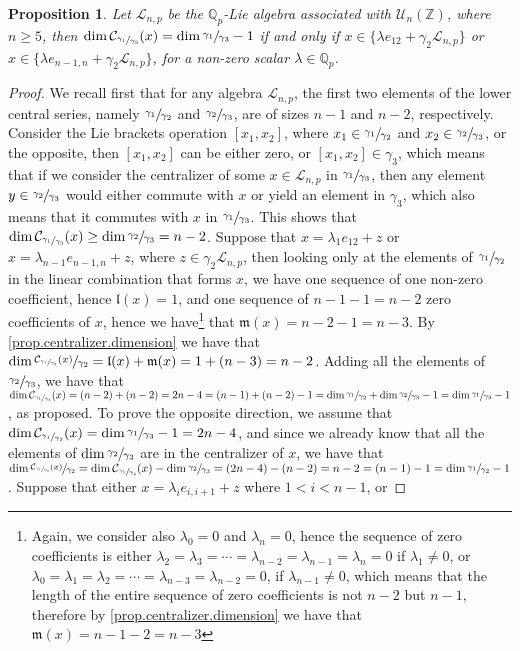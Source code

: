 \documentclass[12pt]{article}
\newtheorem{proposition}[theorem]{Proposition}
\begin{document}
\begin{proposition}
\label{prop.n.geq.5.centralizer.codimension}
Let $\mathcal{L}_{n,p}$ be the $\mathbb{Q}_p$-Lie algebra associated with $\mathcal{U}_n(\mathbb{Z})$, where $n\geq 5$, then $\dim\mathcal{C}_{\sfrac{\gamma_1}{\gamma_3}}(x)=\dim\sfrac{\gamma_1}{\gamma_3}-1$ if and only if $x\in\{\lambda e_{12}+\gamma_2\mathcal{L}_{n,p}\}$ or $x\in\{\lambda e_{n-1,n}+\gamma_2\mathcal{L}_{n,p}\}$, for a non-zero scalar $\lambda\in\mathbb{Q}_p$.
\end{proposition}
\begin{proof}
We recall first that for any algebra $\mathcal{L}_{n,p}$, the first two elements of the lower central series, namely $\sfrac{\gamma_1}{\gamma_2}$ and $\sfrac{\gamma_2}{\gamma_3}$, are of sizes $n-1$ and $n-2$, respectively. Consider the Lie brackets operation $[x_1,x_2]$, where $x_1\in\sfrac{\gamma_1}{\gamma_2}$ and $x_2\in\sfrac{\gamma_2}{\gamma_3}$, or the opposite, then $[x_1,x_2]$ can be either zero, or $[x_1,x_2]\in\gamma_3$, which means that if we consider the centralizer of some $x\in\mathcal{L}_{n,p}$ in $\sfrac{\gamma_1}{\gamma_3}$, then any element $y\in\sfrac{\gamma_2}{\gamma_3}$ would either commute with $x$ or yield an element in $\gamma_3$, which also means that it commutes with $x$ in $\sfrac{\gamma_1}{\gamma_3}$. This shows that $\dim\mathcal{C}_{\sfrac{\gamma_1}{\gamma_3}}(x)\geq\dim\sfrac{\gamma_2}{\gamma_3}=n-2$. Suppose that $x=\lambda_1 e_{12}+z$ or $x=\lambda_{n-1}e_{n-1,n}+z$, where $z\in\gamma_2\mathcal{L}_{n,p}$, then looking only at the elements of $\sfrac{\gamma_1}{\gamma_2}$ in the linear combination that forms $x$, we have one sequence of one non-zero coefficient, hence $\mathfrak{l}(x)=1$, and one sequence of $n-1-1=n-2$ zero coefficients of $x$, hence we have\footnote{Again, we consider also $\lambda_0=0$ and $\lambda_n=0$, hence the sequence of zero coefficients is either $\lambda_2=\lambda_3=\cdots=\lambda_{n-2}=\lambda_{n-1}=\lambda_n=0$ if $\lambda_1\neq 0$, or $\lambda_0=\lambda_1=\lambda_2=\cdots=\lambda_{n-3}=\lambda_{n-2}=0$, if $\lambda_{n-1}\neq 0$, which means that the length of the entire sequence of zero coefficients is not $n-2$ but $n-1$, therefore by \ref{prop.centralizer.dimension} we have that $\mathfrak{m}(x)=n-1-2=n-3$} that $\mathfrak{m}(x)=n-2-1=n-3$. By \ref{prop.centralizer.dimension} we have that $\dim\sfrac{\mathcal{C}_{\sfrac{\gamma_1}{\gamma_3}}(x)}{\gamma_2}=\mathfrak{l}(x)+\mathfrak{m}(x)=1+(n-3)=n-2$. Adding all the elements of $\sfrac{\gamma_2}{\gamma_3}$, we have that $\dim\mathcal{C}_{\sfrac{\gamma_1}{\gamma_3}}(x)=(n-2)+(n-2)=2n-4=(n-1)+(n-2)-1=\dim\sfrac{\gamma_1}{\gamma_2}+\dim\sfrac{\gamma_2}{\gamma_3}-1=\dim\sfrac{\gamma_1}{\gamma_3}-1$, as proposed. To prove the opposite direction, we assume that $\dim\mathcal{C}_{\sfrac{\gamma_1}{\gamma_3}}(x)=\dim\sfrac{\gamma_1}{\gamma_3}-1=2n-4$, and since we already know that all the elements of $\dim\sfrac{\gamma_2}{\gamma_3}$ are in the centralizer of $x$, we have that $\dim\sfrac{\mathcal{C}_{\sfrac{\gamma_1}{\gamma_3}}(x)}{\gamma_2}=\dim\mathcal{C}_{\sfrac{\gamma_1}{\gamma_3}}(x)-\dim\sfrac{\gamma_2}{\gamma_3}=(2n-4)-(n-2)=n-2=(n-1)-1=\dim\sfrac{\gamma_1}{\gamma_2}-1$. Suppose that either $x=\lambda_i e_{i,i+1}+z$ where $1<i<n-1$, or 
\end{proof}
\end{document}
